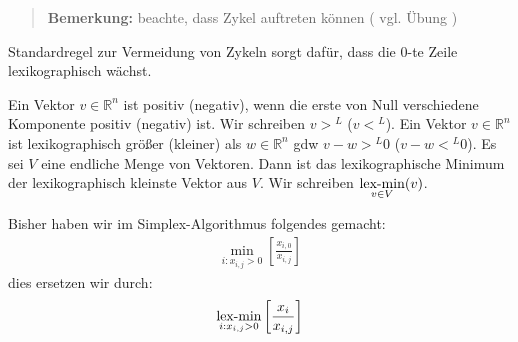 \begin{quote}
\textbf{Bemerkung: } beachte, dass Zykel auftreten können ( vgl. Übung )
\end{quote}
Standardregel zur Vermeidung von Zykeln sorgt dafür, dass die $0$-te Zeile lexikographisch wächst.
\begin{definition}
Ein Vektor $v \in \mathbb R^n$ ist  positiv (negativ), wenn die erste von Null verschiedene Komponente positiv (negativ) ist.
Wir schreiben $v >{}^L$ ($v <{}^L$).
Ein Vektor $v \in \mathbb R^n$ ist lexikographisch größer (kleiner) als $w \in \mathbb R^n$ gdw $v-w >{}^L 0$ ($v-w <{}^L 0$).
Es sei $V$ eine endliche Menge von Vektoren. Dann ist das lexikographische Minimum der lexikographisch kleinste Vektor aus $V$.
Wir schreiben $\operatorname*{lex-min}\limits_{v \in V}(v)$.
\end{definition}
Bisher haben wir im Simplex-Algorithmus folgendes gemacht:
\begin{align*}
\min\limits_{i:x_{i,j} > 0} \left \lbrack \frac{x_{i,0}}{x_{i,j}} \right \rbrack
\end{align*}
dies ersetzen wir durch:
\begin{align*}
\operatorname*{lex-min}_{i:x_{i,j} > 0} \left \lbrack \frac{x_i}{x_{i,j}} \right \rbrack
\end{align*}

